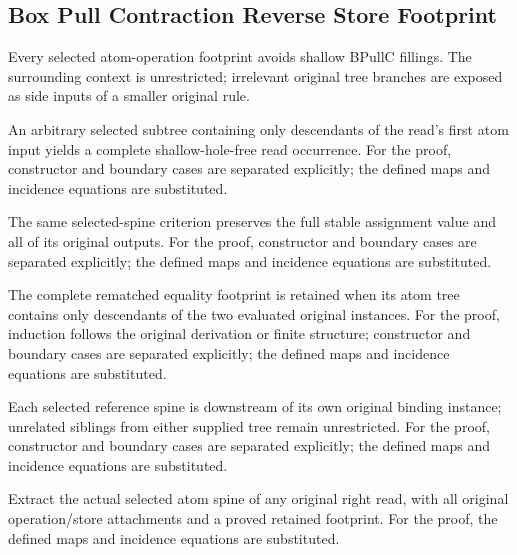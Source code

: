 \subsection{Box Pull Contraction Reverse Store Footprint}
Every selected atom-operation footprint avoids shallow BPullC fillings. The surrounding context is unrestricted; irrelevant original tree branches are exposed as side inputs of a smaller original rule.

An arbitrary selected subtree containing only descendants of the read's first atom input yields a complete shallow-hole-free read occurrence.
For the proof, constructor and boundary cases are separated explicitly; the defined maps and incidence equations are substituted.
\par{}

The same selected-spine criterion preserves the full stable assignment value and all of its original outputs.
For the proof, constructor and boundary cases are separated explicitly; the defined maps and incidence equations are substituted.
\par{}

The complete rematched equality footprint is retained when its atom tree contains only descendants of the two evaluated original instances.
For the proof, induction follows the original derivation or finite structure; constructor and boundary cases are separated explicitly; the defined maps and incidence equations are substituted.
\par{}

Each selected reference spine is downstream of its own original binding instance; unrelated siblings from either supplied tree remain unrestricted.
For the proof, constructor and boundary cases are separated explicitly; the defined maps and incidence equations are substituted.
\par{}

Extract the actual selected atom spine of any original right read, with all original operation/store attachments and a proved retained footprint.
For the proof, the defined maps and incidence equations are substituted.
\par{}

